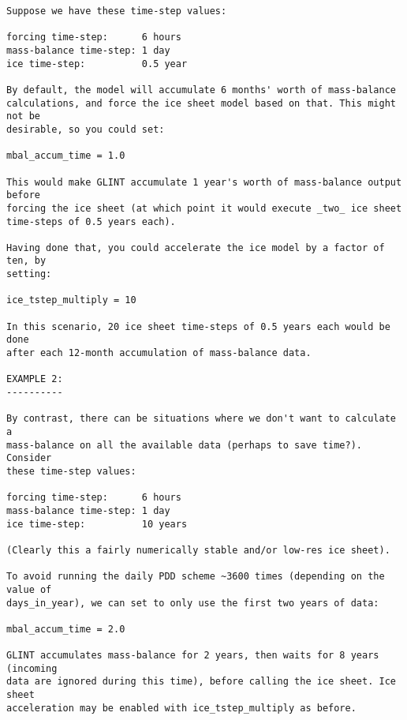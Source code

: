 \begin{verbatim}
Suppose we have these time-step values:

forcing time-step:      6 hours
mass-balance time-step: 1 day
ice time-step:          0.5 year

By default, the model will accumulate 6 months' worth of mass-balance 
calculations, and force the ice sheet model based on that. This might not be 
desirable, so you could set:

mbal_accum_time = 1.0

This would make GLINT accumulate 1 year's worth of mass-balance output before 
forcing the ice sheet (at which point it would execute _two_ ice sheet 
time-steps of 0.5 years each).

Having done that, you could accelerate the ice model by a factor of ten, by 
setting:

ice_tstep_multiply = 10

In this scenario, 20 ice sheet time-steps of 0.5 years each would be done 
after each 12-month accumulation of mass-balance data.

EXAMPLE 2:
----------

By contrast, there can be situations where we don't want to calculate a 
mass-balance on all the available data (perhaps to save time?). Consider 
these time-step values:

forcing time-step:      6 hours
mass-balance time-step: 1 day
ice time-step:          10 years

(Clearly this a fairly numerically stable and/or low-res ice sheet).

To avoid running the daily PDD scheme ~3600 times (depending on the value of 
days_in_year), we can set to only use the first two years of data:

mbal_accum_time = 2.0

GLINT accumulates mass-balance for 2 years, then waits for 8 years (incoming 
data are ignored during this time), before calling the ice sheet. Ice sheet 
acceleration may be enabled with ice_tstep_multiply as before.
\end{verbatim}